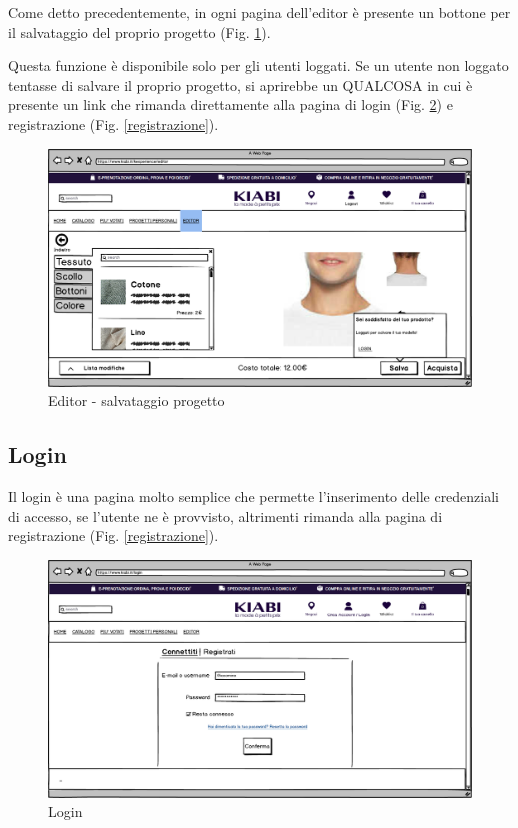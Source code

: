 \documentclass[12pt,italian,]{report}
\begin{document}
Come detto precedentemente, in ogni pagina dell'editor è presente un bottone per il salvataggio del proprio progetto (Fig. \ref{editor_salva}). 

Questa funzione è disponibile solo per gli utenti loggati. Se un utente non loggato tentasse di salvare il proprio progetto, si aprirebbe un QUALCOSA in cui è presente un link che rimanda direttamente alla pagina di login (Fig. \ref{login}) e registrazione (Fig. \ref{registrazione}).

\begin{figure}[h]
\centering
\includegraphics{../../balsamiq/balsamiq_finale/Editor-caratteristicacollotessutononloggato.png}
\caption{Editor - salvataggio progetto}
\label{editor_salva}
\end{figure}


\subsection{Login} 

Il login è una pagina molto semplice che permette l'inserimento delle credenziali di accesso, se l'utente ne è provvisto, altrimenti rimanda alla pagina di registrazione (Fig. \ref{registrazione}).

\begin{figure}[h]
\centering
\includegraphics{../../balsamiq/balsamiq_finale/Login.png}
\caption{Login}
\label{login}
\end{figure}
\end{document}
